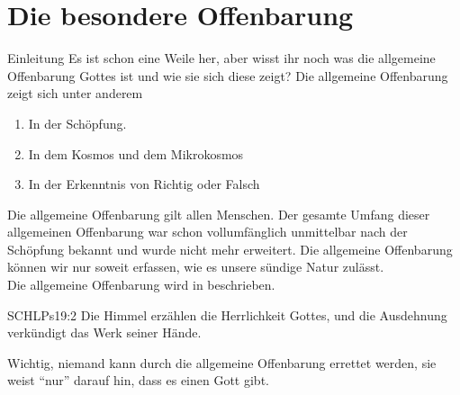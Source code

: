 \section{Die besondere Offenbarung}

\begin{otsblock}{Einleitung}
    Es ist schon eine Weile her, aber wisst ihr noch was die allgemeine Offenbarung Gottes ist und wie sie sich diese zeigt? Die allgemeine Offenbarung zeigt sich unter anderem 
    \begin{enumerate}
        \item [-] In der Schöpfung.
        \item [-] In dem Kosmos und dem Mikrokosmos
        \item [-] In der Erkenntnis von Richtig oder Falsch
    \end{enumerate}
    Die allgemeine Offenbarung gilt allen Menschen. Der gesamte Umfang dieser allgemeinen Offenbarung war schon vollumfänglich unmittelbar nach der Schöpfung bekannt und wurde nicht mehr erweitert. Die allgemeine Offenbarung können wir nur soweit erfassen, wie es unsere sündige Natur zulässt.\\
    Die allgemeine Offenbarung wird in  beschrieben.
    \begin{bibelbox}{SCHL}{Ps}{19:2}
        Die Himmel erzählen die Herrlichkeit Gottes, und die Ausdehnung verkündigt das Werk seiner Hände.
    \end{bibelbox}
    Wichtig, niemand kann durch die allgemeine Offenbarung errettet werden, sie weist \enquote{nur} darauf hin, dass es einen Gott gibt.
\end{otsblock}
